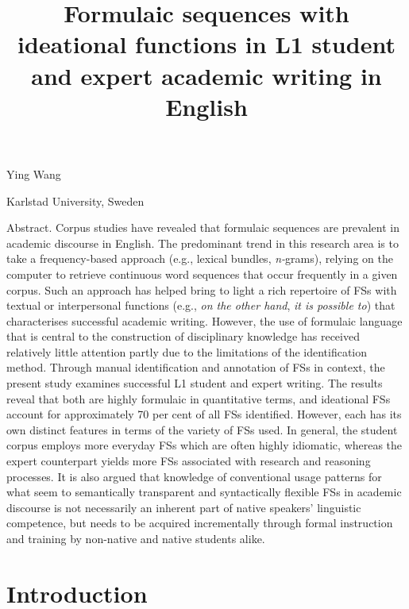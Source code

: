 \documentclass[output=paper]{langsci/langscibook}
\author{\affiliation{}\orcid{}}
\title{}
\begin{document}
\maketitle 

\title{Formulaic sequences with ideational functions in L1 student and expert academic writing in English}

Ying Wang 

Karlstad University, Sweden

Abstract. Corpus studies have revealed that formulaic sequences are prevalent in academic discourse in English. The predominant trend in this research area is to take a frequency-based approach (e.g., lexical bundles, \textit{n-}grams), relying on the computer to retrieve continuous word sequences that occur frequently in a given corpus. Such an approach has helped bring to light a rich repertoire of FSs with textual or interpersonal functions (e.g., \textit{on the other hand}, \textit{it is possible to}) that characterises successful academic writing. However, the use of formulaic language that is central to the construction of disciplinary knowledge has received relatively little attention partly due to the limitations of the identification method. Through manual identification and annotation of FSs in context, the present study examines successful L1 student and expert writing. The results reveal that both are highly formulaic in quantitative terms, and ideational FSs account for approximately 70 per cent of all FSs identified. However, each has its own distinct features in terms of the variety of FSs used. In general, the student corpus employs more everyday FSs which are often highly idiomatic, whereas the expert counterpart yields more FSs associated with research and reasoning processes. It is also argued that knowledge of conventional usage patterns for what seem to semantically transparent and syntactically flexible FSs in academic discourse is not necessarily an inherent part of native speakers’ linguistic competence, but needs to be acquired incrementally through formal instruction and training by non-native and native students alike.

\section{Introduction}
\end{document}
